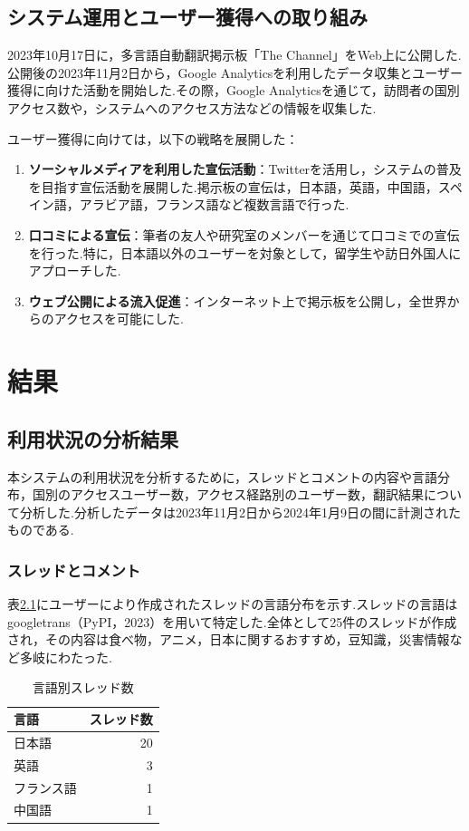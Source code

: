 \documentclass[b5paper,12pt,dvipdfmx]{jsreport}
\begin{document}
\section{システム運用とユーザー獲得への取り組み}

2023年10月17日に，多言語自動翻訳掲示板「The Channel」をWeb上に公開した.公開後の2023年11月2日から，Google Analyticsを利用したデータ収集とユーザー獲得に向けた活動を開始した.その際，Google Analyticsを通じて，訪問者の国別アクセス数や，システムへのアクセス方法などの情報を収集した.

ユーザー獲得に向けては，以下の戦略を展開した：
\begin{enumerate}
    \item \textbf{ソーシャルメディアを利用した宣伝活動}：Twitterを活用し，システムの普及を目指す宣伝活動を展開した.掲示板の宣伝は，日本語，英語，中国語，スペイン語，アラビア語，フランス語など複数言語で行った.
    \item \textbf{口コミによる宣伝}：筆者の友人や研究室のメンバーを通じて口コミでの宣伝を行った.特に，日本語以外のユーザーを対象として，留学生や訪日外国人にアプローチした.
    \item \textbf{ウェブ公開による流入促進}：インターネット上で掲示板を公開し，全世界からのアクセスを可能にした.
\end{enumerate}

\chapter{結果}

\section{利用状況の分析結果}
本システムの利用状況を分析するために，スレッドとコメントの内容や言語分布，国別のアクセスユーザー数，アクセス経路別のユーザー数，翻訳結果について分析した.分析したデータは2023年11月2日から2024年1月9日の間に計測されたものである.

\subsection{スレッドとコメント}

表\ref{tab:thread-language}にユーザーにより作成されたスレッドの言語分布を示す.スレッドの言語はgoogletrans（PyPI，2023）を用いて特定した.全体として25件のスレッドが作成され，その内容は食べ物，アニメ，日本に関するおすすめ，豆知識，災害情報など多岐にわたった.


\begin{table}[H]
    \centering
    \caption{言語別スレッド数}
    \label{tab:thread-language}
    \begin{tabular}{|l|r|}
        \hline
        \textbf{言語} & \textbf{スレッド数} \\ \hline
        日本語       & 20               \\
        英語         & 3                 \\
        フランス語    & 1                 \\
        中国語       & 1                 \\ \hline
    \end{tabular}
\end{table}
\end{document}
